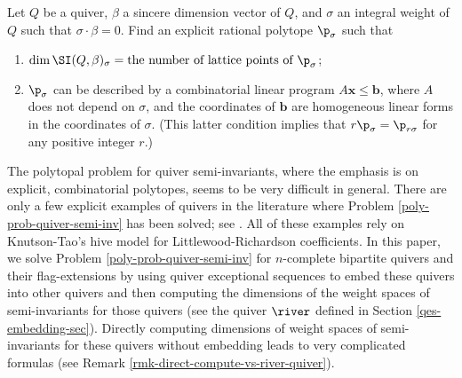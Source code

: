 \begin{problem}\label{poly-prob-quiver-semi-inv}
Let $Q$ be a quiver, $\beta$ a sincere dimension vector of $Q$, and $\sigma$ an integral weight of $Q$ such that $\sigma \cdot \beta=0$. Find an explicit rational polytope $\p_{\sigma}$ such that

\begin{enumerate}
\item $\dim \SI(Q, \beta)_\sigma=\text{the number of lattice points of~} \p_{\sigma}$;

\item $\p_{\sigma}$ can be described by a combinatorial linear program $A\mathbf{x} \leq \mathbf{b}$, where $A$ does not depend on $\sigma$, and the coordinates of $\mathbf{b}$ are homogeneous linear forms in the coordinates of $\sigma$. (This latter condition implies that $r\p_\sigma=\p_{r \sigma}$ for any positive integer $r$.)
\end{enumerate}
\end{problem}
The polytopal problem for quiver semi-invariants, where the emphasis is on explicit, combinatorial polytopes,  seems to be very difficult in general. There are only a few explicit examples of quivers in the literature where Problem \ref{poly-prob-quiver-semi-inv} has been solved; see \cite{CDW, CC1, CC2, Col20, DW1}. All of these examples rely on Knutson-Tao's hive model for Littlewood-Richardson coefficients. In this paper, we solve Problem \ref{poly-prob-quiver-semi-inv} for $n$-complete bipartite quivers and their flag-extensions by using quiver exceptional sequences to embed these quivers into other quivers and then computing the dimensions of the weight spaces  of semi-invariants for those quivers (see the quiver $\river$ defined in Section \ref{qes-embedding-sec}). Directly computing dimensions of weight spaces of semi-invariants for these quivers without embedding leads to very complicated formulas (see Remark \ref{rmk-direct-compute-vs-river-quiver}).

